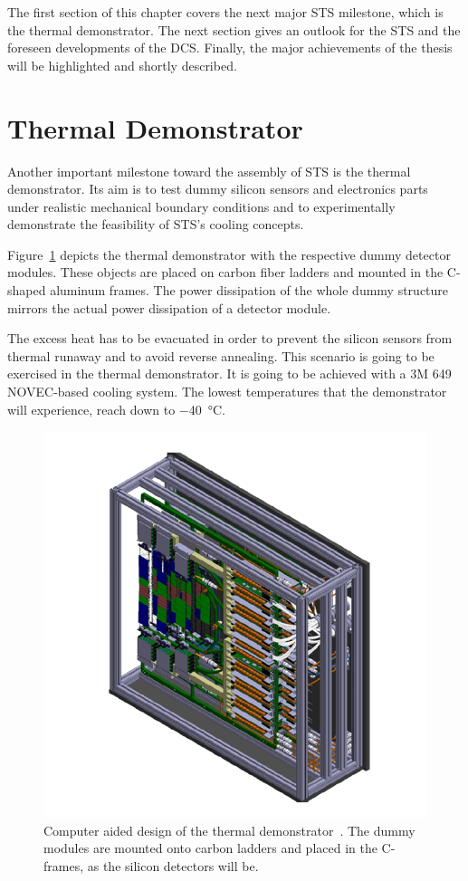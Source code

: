 The first section of this chapter covers the next major \gls{STS} milestone, which is the thermal demonstrator. The next section gives an outlook for the \gls{STS} and the foreseen developments of the \gls{DCS}. Finally, the major achievements of the thesis will be highlighted and shortly described.

\section{Thermal Demonstrator}
Another important milestone toward the assembly of \gls{STS} is the thermal demonstrator. Its aim is to test dummy silicon sensors and electronics parts under realistic mechanical boundary conditions and to experimentally demonstrate the feasibility of \gls{STS}’s cooling concepts. 

Figure~\ref{fig:demo} depicts the thermal demonstrator with the respective dummy detector modules. These objects are placed on carbon fiber ladders and mounted in the C-shaped aluminum frames. The power dissipation of the whole dummy structure mirrors the actual power dissipation of a detector module.

The excess heat has to be evacuated in order to prevent the silicon sensors from thermal runaway and to avoid reverse annealing. This scenario is going to be exercised in the thermal demonstrator. It is going to be achieved with a 3M 649 NOVEC-based cooling system. The lowest temperatures that the demonstrator will experience, reach down to \SI{-40}{\celsius}. 

\begin{figure}[!h]
    \centering
    \includegraphics[width=0.65\columnwidth]{Chapter7/images/thermal_demo.png}
    \caption{Computer aided design of the thermal demonstrator~\cite{thermal_demo}. The dummy modules are mounted onto carbon ladders and placed in the C-frames, as the silicon detectors will be.}
    \label{fig:demo}
\end{figure}
\label{demo}

